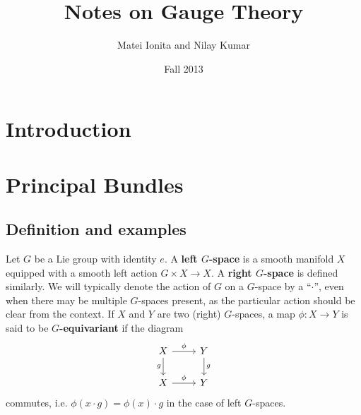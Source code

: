 \documentclass{book}
\title{Notes on Gauge Theory}
\author{Matei Ionita and Nilay Kumar}
\date{Fall 2013}
\theoremstyle{plain}
\theoremstyle{definition}
\theoremstyle{remark}
\begin{document}
\maketitle

\tableofcontents

\hypersetup{linkcolor=blue}

\setcounter{chapter}{-1}

\newpage

\chapter{Introduction}


\chapter{Principal Bundles}

\section{Definition and examples}

Let $G$ be a Lie group with identity $e$. A \textbf{left $G$-space} is a smooth manifold $X$ equipped with a smooth left action $G\times X\to X$. 
A \textbf{right $G$-space} is defined similarly.  We will typically denote the action of $G$ on a $G$-space by a ``$\cdot$'', even when there may
be multiple $G$-spaces present, as the particular action should be clear from the context.
If $X$ and $Y$ are two (right) $G$-spaces, a map $\phi:X\to Y$ is said to be \textbf{$G$-equivariant} if the diagram
\[\begin{tikzcd}
        X\arrow[swap]{d}{g}\arrow{r}{\phi}&Y\arrow{d}{g}\\
        X\arrow{r}{\phi}&Y
\end{tikzcd}\]
commutes, i.e. $\phi(x\cdot g)=\phi(x)\cdot g$ in the case of left $G$-spaces.
\end{document}
